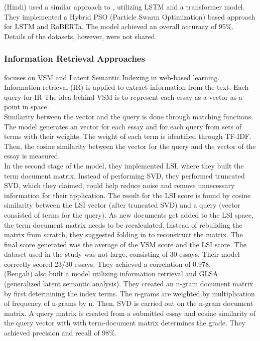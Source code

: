 \documentclass{article}
\begin{document}
	\textbf{\textcite{11_walia2024hybrid}} (Hindi) used a similar approach to \textcite{10_singh2023hindi}, utilizing LSTM and a transformer model. They implemented a Hybrid PSO (Particle Swarm Optimization) based approach for LSTM and RoBERTa. The model achieved an overall accuracy of 95\%. Details of the datasets, however, were not shared.
	
	\subsubsection*{Information Retrieval Approaches}
	\textbf{\textcite{17_abbas2015svm}} focuses on VSM and Latent Semantic Indexing in web-based learning. Information retrieval (IR) is applied to extract information from the text. Each query for IR  The idea behind VSM is to represent each essay as a vector as a point in space. \\ Similarity between the vector and the query is done through matching functions. The model generates an vector for each essay and for each query from sets of terms with their weights. The weight of each term is identified through TF-IDF. Then, the cosine similarity between the vector for the query and the vector of the essay is measured. \\ In the second stage of the model, they implemented LSI, where they built the term document matrix. Instead of performing SVD, they performed truncated SVD, which they claimed, could help reduce noise and remove unnecessary information for their application. The result for the LSI score is found by cosine similarity between the LSI vector (after truncated SVD) and a query (vector consisted of terms for the query). As new documents get added to the LSI space, the term document matrix needs to be recalculated. Instead of rebuilding the matrix from scratch, they suggested folding in to reconstruct the matrix. The final score generated was the average of the VSM score and the LSI score. The dataset used in the study was not large, consisting of 30 essays. Their model correctly scored 23/30 essays. They achieved a correlation of 0.978. \\
	
	
	\textbf{\textcite{24_islam2013abess}} (Bengali) also built a model utilizing information retrieval and GLSA (generalized latent semantic analysis). They created an n-gram document matrix by first determining the index terms. The n-grams are weighted by multiplication of frequency of n-grams by n. Then, SVD is carried out on the n-gram document matrix. A query matrix is created from a submitted essay and cosine similarity of the query vector with with term-document matrix determines the grade. They achieved precision and recall of 98\%. 
	
\end{document}

